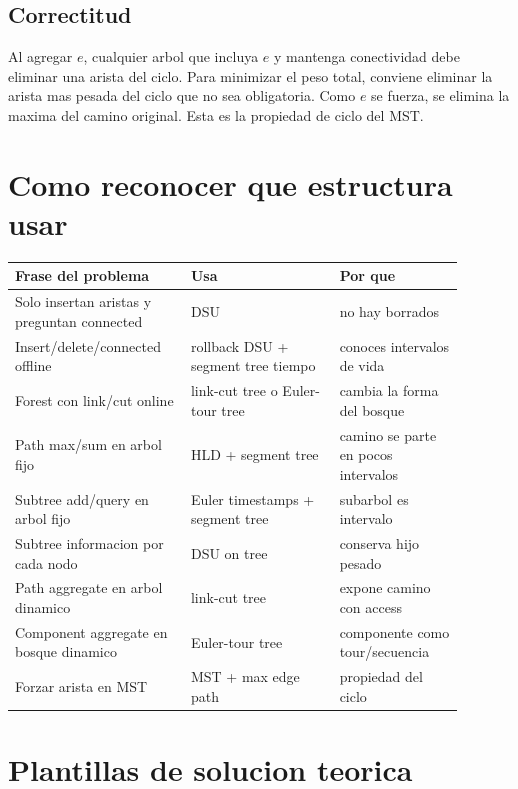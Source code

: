 \documentclass[10pt]{article}
\begin{document}
\subsection{Correctitud}
Al agregar $e$, cualquier arbol que incluya $e$ y mantenga conectividad debe
eliminar una arista del ciclo. Para minimizar el peso total, conviene eliminar
la arista mas pesada del ciclo que no sea obligatoria. Como $e$ se fuerza, se
elimina la maxima del camino original. Esta es la propiedad de ciclo del MST.

\newpage
\section{Como reconocer que estructura usar}

\begin{center}
\begin{tabular}{p{0.34\linewidth}p{0.30\linewidth}p{0.25\linewidth}}
\toprule
Frase del problema & Usa & Por que \\
\midrule
Solo insertan aristas y preguntan connected & DSU & no hay borrados \\
Insert/delete/connected offline & rollback DSU + segment tree tiempo & conoces intervalos de vida \\
Forest con link/cut online & link-cut tree o Euler-tour tree & cambia la forma del bosque \\
Path max/sum en arbol fijo & HLD + segment tree & camino se parte en pocos intervalos \\
Subtree add/query en arbol fijo & Euler timestamps + segment tree & subarbol es intervalo \\
Subtree informacion por cada nodo & DSU on tree & conserva hijo pesado \\
Path aggregate en arbol dinamico & link-cut tree & expone camino con access \\
Component aggregate en bosque dinamico & Euler-tour tree & componente como tour/secuencia \\
Forzar arista en MST & MST + max edge path & propiedad del ciclo \\
\bottomrule
\end{tabular}
\end{center}

\section{Plantillas de solucion teorica}
\end{document}
